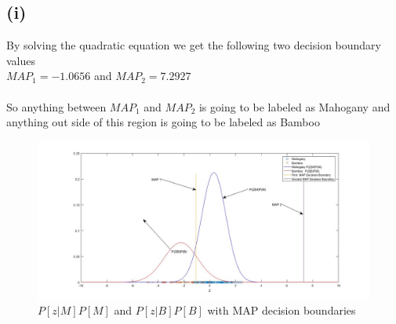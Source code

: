 \documentclass[a4paper,11pt]{article}
\begin{document}
\subsection*{(i)}
By solving the quadratic equation we get the following two decision boundary values\\
$MAP_1 = -1.0656$ and $MAP_2 = 7.2927$\\\\
So anything between $MAP_1$ and $MAP_2$ is going to be labeled as Mahogany and anything out side of this region is going to be labeled as Bamboo
\begin{figure}[h]
  \hspace*{-6cm}
   \includegraphics[scale=0.5]{q1_g}
   \caption{$P[z\vert M]P[M]$ and $P[z\vert B]P[B]$ with MAP decision boundaries }\label{fig:q1_g}
\end{figure}
\clearpage
\newpage
\end{document}
